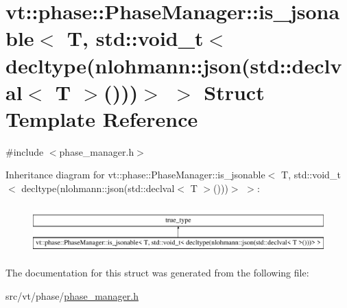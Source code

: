 \hypertarget{structvt_1_1phase_1_1_phase_manager_1_1is__jsonable_3_01_t_00_01std_1_1void__t_3_01decltype_07nl0820926ce17ca6da55b3c6fa99f32f26}{}\section{vt\+:\+:phase\+:\+:Phase\+Manager\+:\+:is\+\_\+jsonable$<$ T, std\+:\+:void\+\_\+t$<$ decltype(nlohmann\+:\+:json(std\+:\+:declval$<$ T $>$()))$>$ $>$ Struct Template Reference}
\label{structvt_1_1phase_1_1_phase_manager_1_1is__jsonable_3_01_t_00_01std_1_1void__t_3_01decltype_07nl0820926ce17ca6da55b3c6fa99f32f26}


{\ttfamily \#include $<$phase\+\_\+manager.\+h$>$}

Inheritance diagram for vt\+:\+:phase\+:\+:Phase\+Manager\+:\+:is\+\_\+jsonable$<$ T, std\+:\+:void\+\_\+t$<$ decltype(nlohmann\+:\+:json(std\+:\+:declval$<$ T $>$()))$>$ $>$\+:\begin{figure}[H]
\begin{center}
\leavevmode
\includegraphics[height=1.882353cm]{structvt_1_1phase_1_1_phase_manager_1_1is__jsonable_3_01_t_00_01std_1_1void__t_3_01decltype_07nl0820926ce17ca6da55b3c6fa99f32f26}
\end{center}
\end{figure}


The documentation for this struct was generated from the following file\+:\begin{DoxyCompactItemize}
\item 
src/vt/phase/\hyperlink{phase__manager_8h}{phase\+\_\+manager.\+h}\end{DoxyCompactItemize}
